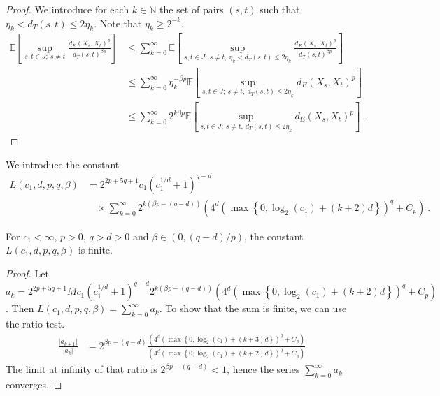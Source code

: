 \begin{proof}\leanok
We introduce for each $k \in \mathbb{N}$ the set of pairs $(s, t)$ such that $\eta_k < d_T(s, t) \le 2 \eta_k$.
Note that $\eta_k \ge 2^{-k}$.
\begin{align*}
  \mathbb{E}\left[ \sup_{s, t \in J;\: s \ne t} \frac{d_E(X_s, X_t)^p}{d_T(s, t)^{\beta p}} \right]
  &\le \sum_{k=0}^\infty \mathbb{E}\left[ \sup_{s, t \in J;\: s \ne t, \: \eta_k < d_T(s, t) \le 2 \eta_k} \frac{d_E(X_s, X_t)^p}{d_T(s, t)^{\beta p}} \right]
  \\
  &\le \sum_{k=0}^\infty \eta_k^{-\beta p} \mathbb{E}\left[ \sup_{s, t \in J;\: s \ne t, \: d_T(s, t) \le 2 \eta_k} d_E(X_s, X_t)^p \right]
  \\
  &\le \sum_{k=0}^\infty 2^{k \beta p} \mathbb{E}\left[ \sup_{s, t \in J;\: s \ne t, \: d_T(s, t) \le 2 \eta_k} d_E(X_s, X_t)^p \right]
  \: .
\end{align*}
\end{proof}


\begin{definition}\label{def:L}
  \leanok
We introduce the constant
\begin{align*}
  L(c_1, d, p, q, \beta)
  &= 2^{2p+5q+1} c_1 (c_1^{1/d}+1)^{q-d}
  \\&\quad \times \sum_{k=0}^\infty 2^{k (\beta p - (q-d))}\left(4^d \left(\max\left\{0, \log_2(c_1) + (k + 2)d \right\}\right)^q
    + C_p\right)
  \: .
\end{align*}
\end{definition}


\begin{lemma}\label{lem:L_lt_top}
  \leanok
For $c_1 < \infty$, $p> 0$, $q > d > 0$ and $\beta \in (0, (q-d)/p)$, the constant $L(c_1, d, p, q, \beta)$ is finite.
\end{lemma}

\begin{proof}
\leanok
Let $a_k = 2^{2p+5q+1} M c_1 (c_1^{1/d}+1)^{q-d} 2^{k (\beta p - (q-d))} \left(4^d \left(\max\left\{0, \log_2(c_1) + (k + 2)d \right\}\right)^q
    + C_p\right)$.
Then $L(c_1, d, p, q, \beta) = \sum_{k=0}^\infty a_k$.
To show that the sum is finite, we can use the ratio test.
\begin{align*}
  \frac{\vert a_{k+1} \vert}{\vert a_k \vert}
  &= 2^{\beta p - (q - d)}
    \frac{\left(4^d \left(\max\left\{0, \log_2(c_1) + (k + 3)d \right\}\right)^q + C_p\right)}
    {\left(4^d \left(\max\left\{0, \log_2(c_1) + (k + 2)d \right\}\right)^q + C_p\right)}
\end{align*}
The limit at infinity of that ratio is $2^{\beta p - (q - d)} < 1$, hence the series $\sum_{k=0}^\infty a_k$ converges.
\end{proof}


